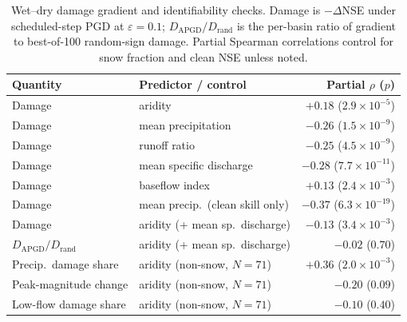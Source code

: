 \documentclass[final]{agujournal2019}
\begin{document}
\begin{table}[ht]
\caption{Wet--dry damage gradient and identifiability checks. Damage is $-\Delta$NSE under scheduled-step PGD at $\varepsilon = 0.1$; $D_{\mathrm{APGD}}/D_{\mathrm{rand}}$ is the per-basin ratio of gradient to best-of-100 random-sign damage. Partial Spearman correlations control for snow fraction and clean NSE unless noted.}
\label{tab:s4_grad}
\centering
\small
\begin{tabular}{llr}
\toprule
Quantity & Predictor / control & Partial $\rho$ ($p$) \\
\midrule
Damage & aridity & $+0.18$ ($2.9\times10^{-5}$) \\
Damage & mean precipitation & $-0.26$ ($1.5\times10^{-9}$) \\
Damage & runoff ratio & $-0.25$ ($4.5\times10^{-9}$) \\
Damage & mean specific discharge & $-0.28$ ($7.7\times10^{-11}$) \\
Damage & baseflow index & $+0.13$ ($2.4\times10^{-3}$) \\
\midrule
Damage & mean precip.\ (clean skill only) & $-0.37$ ($6.3\times10^{-19}$) \\
Damage & aridity (+ mean sp.\ discharge) & $-0.13$ ($3.4\times10^{-3}$) \\
$D_{\mathrm{APGD}}/D_{\mathrm{rand}}$ & aridity (+ mean sp.\ discharge) & $-0.02$ ($0.70$) \\
\midrule
Precip.\ damage share & aridity (non-snow, $N=71$) & $+0.36$ ($2.0\times10^{-3}$) \\
Peak-magnitude change & aridity (non-snow, $N=71$) & $-0.20$ ($0.09$) \\
Low-flow damage share & aridity (non-snow, $N=71$) & $-0.10$ ($0.40$) \\
\bottomrule
\end{tabular}
\end{table}


\end{document}
